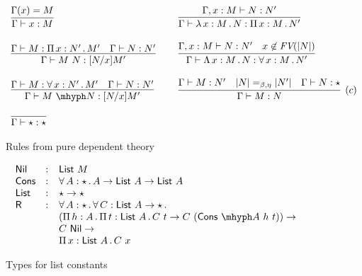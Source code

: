 \documentclass{article}
\begin{document}
\begin{figure}
\[
\begin{array}{lll}
  \infer{\Gamma\vdash x : M}{\Gamma(x) = M}
  &\ &
  \infer{\Gamma\vdash \tlam{x}{M}{N} : \Pia{x}{M}{N'}}{\Gamma,x:M\vdash N : N'}
  \\ \\
  \infer{\Gamma\vdash M\ N: [N/x]M'}{\Gamma\vdash M:\Pia{x}{N'}{M'} & \Gamma \vdash N:N'}
  &\ &
  \infer{\Gamma\vdash \Tlam{x}{M}{N} : \allt{x}{M}{N'}}{\Gamma,x:M\vdash N : N' & x\not\in\textit{FV}(|N|)}
  \\ \\
  \infer{\Gamma\vdash \appe{M}{N}: [N/x]M'}{\Gamma\vdash M:\allt{x}{N'}{M'} & \Gamma \vdash N:N'}
  &\ &
  \infer[(c)]{\Gamma \vdash M : N}{\Gamma \vdash M : N' & |N| =_{\beta,\eta} |N'| & \Gamma\vdash N:\star}
  \\ \\
    \infer{\Gamma \vdash \star : \star}{\ }
&\ &\ 
\end{array}
\]
\caption{Rules from pure dependent theory}
\label{fig:sartpdep}
\end{figure}

\begin{figure}
  \[
  \begin{array}{lll}
  \mathsf{Nil} & : & \mathsf{List}\ M
\\
\mathsf{Cons} & : & \allt{A}{\star}{A \to \mathsf{List}\ A \to \mathsf{List}\ A}
 \\
 \mathsf{List} & : & \star \to \star
 \\
 \mathsf{R} & : & \allt{A}{\star}{\allt{C}{\mathsf{List}\ A \to \star}{\ }} \\
   \ &\ &
   (\Pia{h}{A}{\Pia{t}{\mathsf{List}\ A}{C\ t \to C\ (\appe{\mathsf{Cons}}{A}\ h\ t)}}) \to \\
   \ &\ &  C\ \mathsf{Nil} \to \\
   \ &\ & \Pia{x}{\mathsf{List}\ A}{C\ x}
  \end{array}
  \]
\caption{Types for list constants}
\label{fig:sartplist}
  \end{figure}
\end{document}
